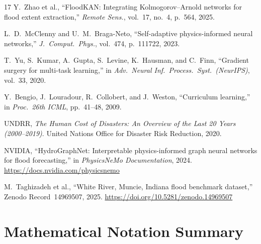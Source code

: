 \documentclass[conference]{IEEEtran}
\begin{document}
\begin{thebibliography}{17}
Y.~Zhao et al., ``FloodKAN: Integrating Kolmogorov--Arnold networks for
flood extent extraction,'' \textit{Remote Sens.}, vol.~17, no.~4,
p.~564, 2025.

L.~D.~McClenny and U.~M.~Braga-Neto, ``Self-adaptive physics-informed
neural networks,'' \textit{J.\ Comput.\ Phys.}, vol.~474, p.~111722, 2023.

T.~Yu, S.~Kumar, A.~Gupta, S.~Levine, K.~Hausman, and C.~Finn, ``Gradient
surgery for multi-task learning,'' in \textit{Adv.\ Neural Inf.\ Process.\
Syst.\ (NeurIPS)}, vol.~33, 2020.

Y.~Bengio, J.~Louradour, R.~Collobert, and J.~Weston, ``Curriculum
learning,'' in \textit{Proc.\ 26th ICML}, pp.~41--48, 2009.

UNDRR, \textit{The Human Cost of Disasters: An Overview of the Last 20
Years (2000--2019)}. United Nations Office for Disaster Risk Reduction,
2020.

NVIDIA, ``HydroGraphNet: Interpretable physics-informed graph neural
networks for flood forecasting,'' in \textit{PhysicsNeMo Documentation},
2024. \url{https://docs.nvidia.com/physicsnemo}

M.~Taghizadeh et al., ``White River, Muncie, Indiana flood benchmark
dataset,'' Zenodo Record~14969507, 2025.
\url{https://doi.org/10.5281/zenodo.14969507}

\end{thebibliography}

\appendix

\section{Mathematical Notation Summary}
\label{app:notation}
\end{document}

